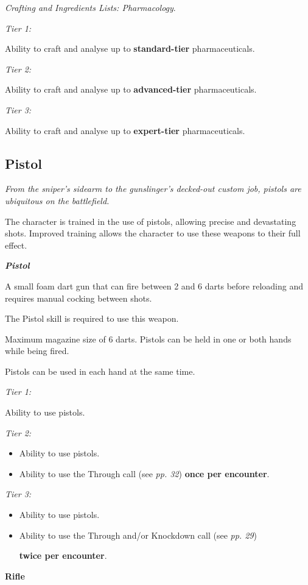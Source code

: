 \textit{Crafting and Ingredients Lists: Pharmacology}.

\textit{Tier 1:}

Ability to craft and analyse up to \textbf{standard-tier} pharmaceuticals.

\textit{Tier 2:}

Ability to craft and analyse up to \textbf{advanced-tier} pharmaceuticals.

\textit{Tier 3:}

Ability to craft and analyse up to \textbf{expert-tier} pharmaceuticals.

\subsection{Pistol}

\textit{From the sniper's sidearm to the gunslinger's decked-out custom job, pistols are ubiquitous on the battlefield.}

The character is trained in the use of pistols, allowing precise and devastating shots. Improved training allows the character to use these weapons to their full effect.

\textbf{\textit{Pistol}}

A small foam dart gun that can fire between 2 and 6 darts before reloading and requires manual cocking between shots.

The Pistol skill is required to use this weapon.

Maximum magazine size of 6 darts. Pistols can be held in one or both hands while being fired.

Pistols can be used in each hand at the same time.

\textit{Tier 1:}

Ability to use pistols.

\textit{Tier 2:}

\begin{itemize}
\item Ability to use pistols.

\item Ability to use the Through call (see \textit{pp. 32}) \textbf{once per encounter}.

\end{itemize}
\textit{Tier 3:}

\begin{itemize}
\item Ability to use pistols.

\item Ability to use the Through and/or Knockdown call (see \textit{pp. 29})

\textbf{twice per encounter}.

\end{itemize}
\textbf{Rifle}

